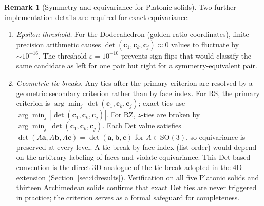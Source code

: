 \documentclass[12pt]{article}
\theoremstyle{definition}
\newtheorem{remark}{Remark}[section]
\begin{document}
\begin{remark}[Symmetry and equivariance for Platonic solids]
Two further implementation details are required for exact equivariance:
\begin{enumerate}[nosep]
  \item \emph{Epsilon threshold.}
    For the Dodecahedron (golden-ratio coordinates), finite-precision
    arithmetic causes $\det(\mathbf{c}_1,\mathbf{c}_k,\mathbf{c}_j)\approx 0$
    values to fluctuate by $\sim 10^{-16}$.
    The threshold $\varepsilon=10^{-10}$ prevents sign-flips that would
    classify the same candidate as left for one pair but right for a
    symmetry-equivalent pair.
  \item \emph{Geometric tie-breaks.}
    Any ties after the primary criterion are resolved by a geometric
    secondary criterion rather than by face index.
    For RS, the primary criterion is $\arg\min_j\,\det(\mathbf{c}_1,\mathbf{c}_k,\mathbf{c}_j)$;
    exact ties use $\arg\min_j\,|\det(\mathbf{c}_1,\mathbf{c}_k,\mathbf{c}_j)|$.
    For RZ, $z$-ties are broken by $\arg\min_j\,\det(\mathbf{c}_1,\mathbf{c}_k,\mathbf{c}_j)$.
    Each Det value satisfies
    $\det(A\mathbf{a},A\mathbf{b},A\mathbf{c})=\det(\mathbf{a},\mathbf{b},\mathbf{c})$
    for $A\in\mathrm{SO}(3)$, so equivariance is preserved at every level.
    A tie-break by face index (list order) would depend on the arbitrary
    labeling of faces and violate equivariance.
    This Det-based convention is the direct 3D analogue of the tie-break
    adopted in the 4D extension (Section~\ref{sec:4dresults}).
    Verification on all five Platonic solids and thirteen Archimedean solids
    confirms that exact Det ties are never triggered in practice;
    the criterion serves as a formal safeguard for completeness.
\end{enumerate}

\end{remark}
\end{document}

